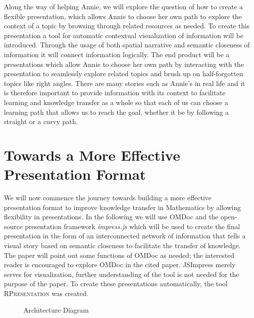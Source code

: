 \documentclass{llncs}
\newcommand{\sys}{\textsc{RPresentation}\xspace}
\begin{document}
Along the way of helping Annie, we will explore the question of how to create a flexible presentation, which allows Annie to choose her own path to explore the context of a topic by browsing through related resources as needed. To create this presentation a tool for automatic contextual visualization of information will be introduced. Through the usage of both spatial narrative and semantic closeness of information it will connect information logically. The end product will be a presentations which allow Annie to choose her own path by interacting with the presentation to seamlessly explore related topics and brush up on half-forgotten topics like right angles. There are many stories such as Annie's in real life and it is therefore important to provide information with its context to facilitate learning and knowledge transfer as a whole so that each of us can choose a learning path that allows us to reach the goal, whether it be by following a straight or a curvy path.

\section{Towards a More Effective Presentation Format}
\label{sec:TowardsAMoreEffectivePresentationFormat}

We will now commence the journey towards building a more effective presentation format to improve knowledge transfer in Mathematics by allowing flexibility in presentations. In the following we will use OMDoc \cite{Kohlhase:OMDoc1.2} and the open-source presentation framework \textit{impress.js} \cite{JSImpress:npentrel14} which will be used to create the final presentation in the form of an interconnected network of information that tells a visual story based on semantic closeness to facilitate the transfer of knowledge. The paper will point out some functions of OMDoc as needed; the interested reader is encouraged to explore OMDoc in the cited paper. JSImpress merely serves for visualization, further understanding of the tool is not needed for the purpose of the paper. To create these presentations automatically, the tool \sys \cite{npentrel:npentrel15} was created. 

\begin{figure}\centering\vspace{-2em}
  \vspace{-1.7em}
  \caption{Architecture Diagram}\label{fig:architecture}
  \vspace{-1.5em}
\end{figure}
\end{document}
